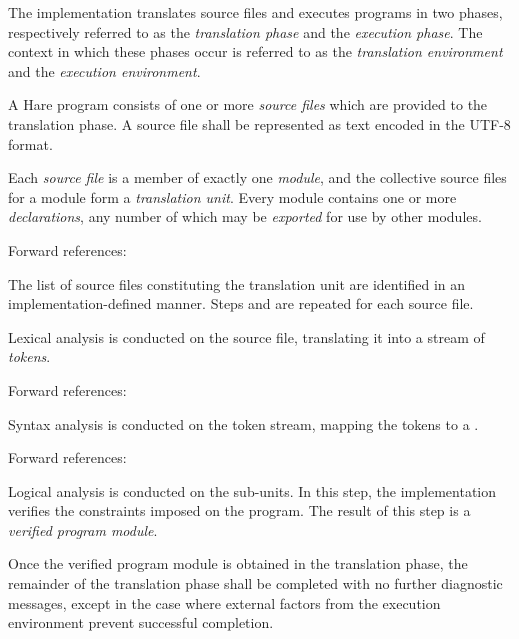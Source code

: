 
\specitem
The implementation translates source files and executes programs in two phases,
respectively referred to as the \textit{translation phase} and the
\textit{execution phase}. The context in which these phases occur is referred
to as the \textit{translation environment} and the \textit{execution
environment}.


\specsubitem
A Hare program consists of one or more \textit{source files} which are provided
to the translation phase. A source file shall be represented as text encoded in
the \hbox{UTF-8} format.

\specsubitem
Each \textit{source file} is a member of exactly one \textit{module}, and the
collective source files for a module form a \textit{translation unit}. Every
module contains one or more \textit{declarations}, any number of which may be
\textit{exported} for use by other modules.

Forward references: 


\specsubitem
The list of source files constituting the translation unit are identified in an
implementation-defined manner. Steps  and
 are repeated for each source file.

\specsubitem
Lexical analysis is conducted on the source file, translating it into a stream
of \textit{tokens}.

Forward references: 

\specsubitem
Syntax analysis is conducted on the token stream, mapping the tokens to a
.

Forward references: 

\specsubitem
Logical analysis is conducted on the sub-units. In this step, the implementation
verifies the constraints imposed on the program. The result of this step is a
\textit{verified program module}.


\specsubitem
Once the verified program module is obtained in the translation phase, the
remainder of the translation phase shall be completed with no further
diagnostic messages, except in the case where external factors from the
execution environment prevent successful completion.

